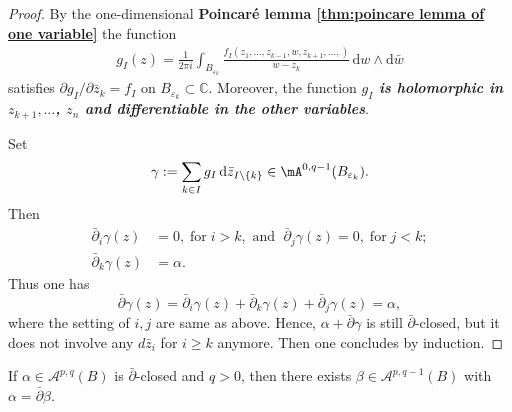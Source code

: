 \begin{proof}
By the one-dimensional \textbf{Poincaré lemma \ref{thm:poincare lemma of one variable}}  the function
\begin{align*}
g_I(z)=\frac{1}{2 \pi i} \int_{B_{\varepsilon_k}} \frac{f_I\left(z_1, \ldots, z_{k-1}, w, z_{k+1}, \ldots,\right)}{w-z_k} \,\mathrm{d}w \wedge \mathrm{d}\bar{w}
\end{align*}
satisfies $\partial g_I/\partial \bar{z}_k=f_I$ on $B_{\varepsilon_k} \subset \mathbb{C}$. Moreover, the function \textcolor[rgb]{0.75,0.16,0.44}{\textit{\textbf{$g_I$ is holomorphic in $z_{k+1}, \ldots$, $ z_n$ and differentiable in the other variables}}}.

Set {\color{DarkBlue}\[\gamma:=\sum_{k \in I} g_I \,\mathrm{d}\bar{z}_{I \backslash\{k\}}\in \mA^{0,q-1}(B_{\varepsilon_k}).\]}
 Then 
 {\color[rgb]{0.75,0.16,0.44}
 \begin{align*}
\bar{\partial}_i \gamma(z)&=0,\;\text{for}\; i>k, \text{ and } \; \bar{\partial}_j \gamma(z)=0, \;\text{for} \; j<k;\\ 
\bar{\partial}_k \gamma(z) &=\alpha.
 \end{align*}}
  Thus one has 
  \[
  \bar{\partial} \gamma(z)=\bar{\partial}_i \gamma(z)+\bar{\partial}_k \gamma(z)+\bar{\partial}_j \gamma(z)= \alpha,
  \]
  where the setting of $i,j$ are same as above. Hence, $\alpha+\bar{\partial} \gamma$ is still $\bar{\partial}$-closed, but it does not involve any $d \bar{z}_i$ for $i \geq k$ anymore. Then one concludes by induction.
\end{proof}

\begin{corollary}
  If $\alpha \in \mathcal{A}^{p, q}(B)$ is $\bar{\partial}$-closed and $q>0$, then there exists $\beta \in \mathcal{A}^{p, q-1}(B)$ with $\alpha=\bar{\partial} \beta$.
\end{corollary}

